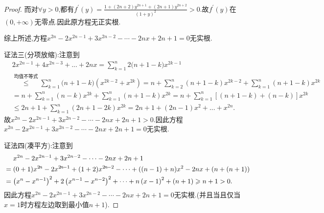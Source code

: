 \documentclass[lang=cn,newtx,10pt,scheme=chinese]{../Template/elegantbook}
\begin{document}
\begin{proof}
    而对\(\forall y > 0\),都有\(f^{\prime}(y) = \frac{1 + (2n + 2)y^{2n + 1} + (2n + 1)y^{2n + 2}}{(1 + y)^2} > 0\).故\(f^{\prime}(y)\)在\((0, +\infty)\)无零点.因此原方程无正实根.

    综上所述,方程\(x^{2n} - 2x^{2n - 1} + 3x^{2n - 2} - \cdots - 2nx + 2n + 1 = 0\)无实根.

    {\color{blue}证法三(分项放缩):}注意到
    \begin{align*}
        &2x^{2n-1}+4x^{2n-3}+...+2nx=\sum_{k=1}^n{2(n}+1-k)x^{2k-1}
        \\
        &\overset{\hyperref[note:1.1111]{\text{均值不等式}}}{\leqslant}\sum_{k=1}^n{(n}+1-k)\left( x^{2k-2}+x^{2k} \right) =n+\sum_{k=2}^n{(n+1-k)x^{2k-2}}+\sum_{k=1}^n{(n+1-k)x^{2k}}
        \\
        &=n+\sum_{k=1}^n{(n-k)x^{2k}}+\sum_{k=1}^n{(n+1-k)x^{2k}}=n+\sum_{k=1}^n{\left[ (n+1-k)+(n-k) \right] x^{2k}}
        \\
        &\leqslant 2n+1+\sum_{k=1}^n{(2n+1-2k)x^{2k}}=2n+1+(2n-1)x^2+...+x^{2n}.
    \end{align*}
    故\(x^{2n} - 2x^{2n - 1} + 3x^{2n - 2} - \cdots - 2nx + 2n + 1 > 0\).因此方程\(x^{2n} - 2x^{2n - 1} + 3x^{2n - 2} - \cdots - 2nx + 2n + 1 = 0\)无实根.

    {\color{blue}证法四(凑平方):}注意到
    \begin{align*}\label{eq:别样的凑平方技巧}
        &\,\,\,\,\,\,\,\,x^{2n}-2x^{2n-1}+3x^{2n-2}-\cdots -2nx+2n+1
\\
&=(0+1)x^{2\hskip -1pt n}-2x^{2\hskip -1pt n\hskip -1pt -1}+(1+2)x^{2\hskip -1pt n\hskip -1pt -2}-\cdots+((n-1)+n)x^2-2nx+(n+(n+1))
\\
&=\left( x^n-x^{n-1} \right) ^2+2\left( x^{n-1}-x^{n-2} \right) ^2+\cdots +n\left( x-1 \right) ^2+\left( n+1 \right) \geqslant n+1>0.
    \end{align*}
    因此方程\(x^{2n} - 2x^{2n - 1} + 3x^{2n - 2} - \cdots - 2nx + 2n + 1 = 0\)无实根.(并且当且仅当\(x = 1\)时方程左边取到最小值\(n + 1\)).

\end{proof}
\end{document}
